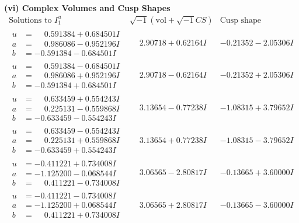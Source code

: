 \documentclass[1p]{elsarticle_modified}
\theoremstyle{definition}
\newcommand{\I}{\sqrt{-1}}
\begin{document}
\newpage\flushleft \textbf{(vi) Complex Volumes and Cusp Shapes}
$$\begin{array}{c|c|c}  
\text{Solutions to }I^u_{1}& \I (\text{vol} + \sqrt{-1}CS) & \text{Cusp shape}\\
 \hline 
\begin{aligned}
u &= \phantom{-}0.591384 + 0.684501 I \\
a &= \phantom{-}0.986086 - 0.952196 I \\
b &= -0.591384 - 0.684501 I\end{aligned}
 & \phantom{-}2.90718 + 0.62164 I & -0.21352 - 2.05306 I \\ \hline\begin{aligned}
u &= \phantom{-}0.591384 - 0.684501 I \\
a &= \phantom{-}0.986086 + 0.952196 I \\
b &= -0.591384 + 0.684501 I\end{aligned}
 & \phantom{-}2.90718 - 0.62164 I & -0.21352 + 2.05306 I \\ \hline\begin{aligned}
u &= \phantom{-}0.633459 + 0.554243 I \\
a &= \phantom{-}0.225131 - 0.559868 I \\
b &= -0.633459 - 0.554243 I\end{aligned}
 & \phantom{-}3.13654 - 0.77238 I & -1.08315 + 3.79652 I \\ \hline\begin{aligned}
u &= \phantom{-}0.633459 - 0.554243 I \\
a &= \phantom{-}0.225131 + 0.559868 I \\
b &= -0.633459 + 0.554243 I\end{aligned}
 & \phantom{-}3.13654 + 0.77238 I & -1.08315 - 3.79652 I \\ \hline\begin{aligned}
u &= -0.411221 + 0.734008 I \\
a &= -1.125200 - 0.068544 I \\
b &= \phantom{-}0.411221 - 0.734008 I\end{aligned}
 & \phantom{-}3.06565 - 2.80817 I & -0.13665 + 3.60000 I \\ \hline\begin{aligned}
u &= -0.411221 - 0.734008 I \\
a &= -1.125200 + 0.068544 I \\
b &= \phantom{-}0.411221 + 0.734008 I\end{aligned}
 & \phantom{-}3.06565 + 2.80817 I & -0.13665 - 3.60000 I \\ \hline\begin{aligned}

\end{aligned}
\end{array}$$
\end{document}

